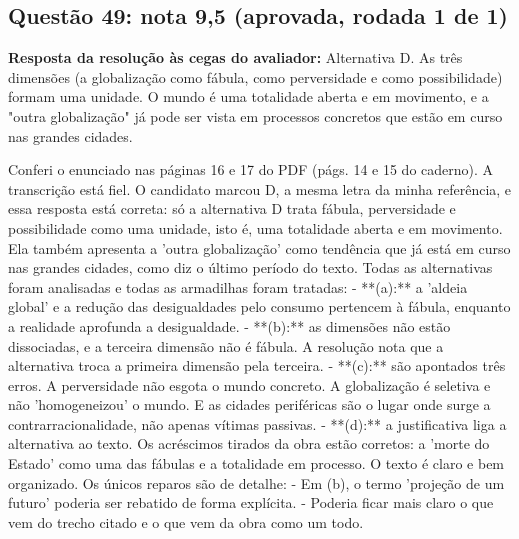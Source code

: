 \documentclass{article}%
\begin{document}
\subsection*{Questão 49: nota 9,5 (aprovada, rodada 1 de 1)}%
\textbf{Resposta da resolução às cegas do avaliador:} Alternativa D. As três dimensões (a globalização como fábula, como perversidade e como possibilidade) formam uma unidade. O mundo é uma totalidade aberta e em movimento, e a "outra globalização" já pode ser vista em processos concretos que estão em curso nas grandes cidades.\par %
Conferi o enunciado nas páginas 16 e 17 do PDF (págs. 14 e 15 do caderno). A transcrição está fiel. O candidato marcou D, a mesma letra da minha referência, e essa resposta está correta: só a alternativa D trata fábula, perversidade e possibilidade como uma unidade, isto é, uma totalidade aberta e em movimento. Ela também apresenta a 'outra globalização' como tendência que já está em curso nas grandes cidades, como diz o último período do texto.\newline%
\newline%
Todas as alternativas foram analisadas e todas as armadilhas foram tratadas:\newline%
{-} **(a):** a 'aldeia global' e a redução das desigualdades pelo consumo pertencem à fábula, enquanto a realidade aprofunda a desigualdade.\newline%
{-} **(b):** as dimensões não estão dissociadas, e a terceira dimensão não é fábula. A resolução nota que a alternativa troca a primeira dimensão pela terceira.\newline%
{-} **(c):** são apontados três erros. A perversidade não esgota o mundo concreto. A globalização é seletiva e não 'homogeneizou' o mundo. E as cidades periféricas são o lugar onde surge a contrarracionalidade, não apenas vítimas passivas.\newline%
{-} **(d):** a justificativa liga a alternativa ao texto.\newline%
\newline%
Os acréscimos tirados da obra estão corretos: a 'morte do Estado' como uma das fábulas e a totalidade em processo. O texto é claro e bem organizado.\newline%
\newline%
Os únicos reparos são de detalhe:\newline%
{-} Em (b), o termo 'projeção de um futuro' poderia ser rebatido de forma explícita.\newline%
{-} Poderia ficar mais claro o que vem do trecho citado e o que vem da obra como um todo.\newline%
\end{document}
